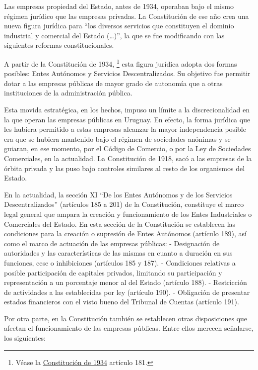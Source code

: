 \documentclass[
  12pt,
  spanish,
]{book}
\begin{document}
Las empresas propiedad del Estado, antes de 1934, operaban bajo el mismo
régimen jurídico que las empresas privadas. La Constitución de ese año
crea una nueva figura jurídica para ``los diversos servicios que
constituyen el dominio industrial y comercial del Estado (\ldots)'', la
que se fue modificando con las siguientes reformas constitucionales.

A partir de la Constitución de 1934, \footnote{Véase la
  \href{https://legislativo.parlamento.gub.uy/temporales/2680947.HTML}{Constitución
  de 1934} artículo 181.} esta figura jurídica adopta dos formas
posibles: Entes Autónomos y Servicios Descentralizados. Su objetivo fue
permitir dotar a las empresas públicas de mayor grado de autonomía que a
otras instituciones de la administración pública.

Esta movida estratégica, en los hechos, impuso un límite a la
discrecionalidad en la que operan las empresas públicas en Uruguay. En
efecto, la forma jurídica que les hubiera permitido a estas empresas
alcanzar la mayor independencia posible era que se hubiera mantenido
bajo el régimen de sociedades anónimas y se guiaran, en ese momento, por
el Código de Comercio, o por la Ley de Sociedades Comerciales, en la
actualidad. La Constitución de 1918, sacó a las empresas de la órbita
privada y las puso bajo controles similares al resto de los organismos
del Estado.

En la actualidad, la sección XI ``De los Entes Autónomos y de los
Servicios Descentralizados'' (artículos 185 a 201) de la Constitución,
constituye el marco legal general que ampara la creación y
funcionamiento de los Entes Industriales o Comerciales del Estado. En
esta sección de la Constitución se establecen las condiciones para la
creación o supresión de Entes Autónomos (artículo 189), así como el
marco de actuación de las empresas públicas: - Designación de
autoridades y las características de las mismas en cuanto a duración en
sus funciones, cese o inhibiciones (artículos 185 y 187). - Condiciones
relativas a posible participación de capitales privados, limitando su
participación y representación a un porcentaje menor al del Estado
(artículo 188). - Restricción de actividades a las establecidas por ley
(artículo 190). - Obligación de presentar estados financieros con el
visto bueno del Tribunal de Cuentas (artículo 191).

Por otra parte, en la Constitución también se establecen otras
disposiciones que afectan el funcionamiento de las empresas públicas.
Entre ellos merecen señalarse, los siguientes:
\end{document}

